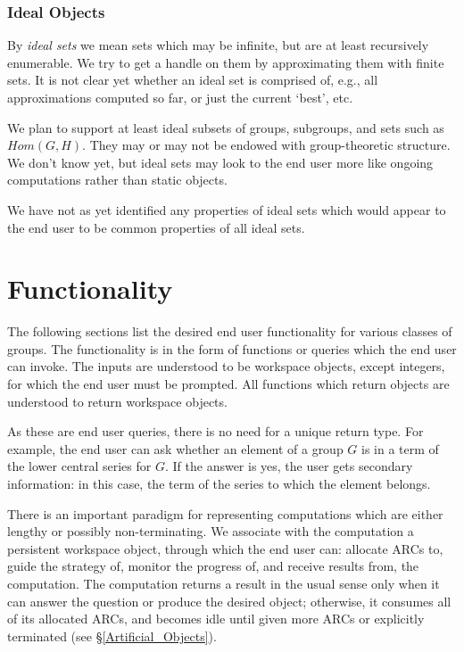 \subsubsection{Ideal Objects}

By {\em ideal sets} we mean sets which may be infinite, but are at
least recursively enumerable. We try to get a handle on them by
approximating them with finite sets. It is not clear yet whether an
ideal set is comprised of, e.g., all approximations computed so far,
or just the current `best', etc.

We plan to support at least ideal subsets of groups, subgroups, and
sets such as $Hom(G,H)$. They may or may not be endowed with
group-theoretic structure. We don't know yet, but ideal sets may look
to the end user more like ongoing computations rather than static
objects.

We have not as yet identified any properties of ideal sets which would
appear to the end user to be common properties of all ideal sets.


\section{Functionality}

The following sections list the desired end user functionality for
various classes of groups. The functionality is in the form of
functions or queries which the end user can invoke.  The inputs are
understood to be workspace objects, except integers, for which the end
user must be prompted.  All functions which return objects are
understood to return workspace objects.

As these are end user queries, there is no need for a unique return
type. For example, the end user can ask whether an element of a group
$G$ is in a term of the lower central series for $G$. If the answer is
yes, the user gets secondary information: in this case, the term of
the series to which the element belongs.

There is an important paradigm for representing computations which are
either lengthy or possibly non-terminating. We associate with the
computation a persistent workspace object, through which the end user
can: allocate ARCs to, guide the strategy of, monitor the progress of,
and receive results from, the computation. The computation returns a
result in the usual sense only when it can answer the question or
produce the desired object; otherwise, it consumes all of its
allocated ARCs, and becomes idle until given more ARCs or explicitly
terminated (see \S\ref{Artificial_Objects}).



